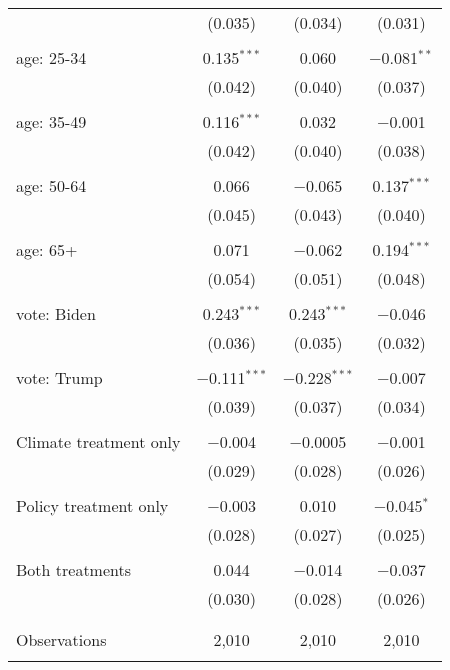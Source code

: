 \begin{tabular}{@{\extracolsep{5pt}}lccc}
  & (0.035) & (0.034) & (0.031) \\ 
  & & & \\ 
 age: 25-34 & 0.135$^{***}$ & 0.060 & $-$0.081$^{**}$ \\ 
  & (0.042) & (0.040) & (0.037) \\ 
  & & & \\ 
 age: 35-49 & 0.116$^{***}$ & 0.032 & $-$0.001 \\ 
  & (0.042) & (0.040) & (0.038) \\ 
  & & & \\ 
 age: 50-64 & 0.066 & $-$0.065 & 0.137$^{***}$ \\ 
  & (0.045) & (0.043) & (0.040) \\ 
  & & & \\ 
 age: 65+ & 0.071 & $-$0.062 & 0.194$^{***}$ \\ 
  & (0.054) & (0.051) & (0.048) \\ 
  & & & \\ 
 vote: Biden & 0.243$^{***}$ & 0.243$^{***}$ & $-$0.046 \\ 
  & (0.036) & (0.035) & (0.032) \\ 
  & & & \\ 
 vote: Trump & $-$0.111$^{***}$ & $-$0.228$^{***}$ & $-$0.007 \\ 
  & (0.039) & (0.037) & (0.034) \\ 
  & & & \\ 
 Climate treatment only & $-$0.004 & $-$0.0005 & $-$0.001 \\ 
  & (0.029) & (0.028) & (0.026) \\ 
  & & & \\ 
 Policy treatment only & $-$0.003 & 0.010 & $-$0.045$^{*}$ \\ 
  & (0.028) & (0.027) & (0.025) \\ 
  & & & \\ 
 Both treatments & 0.044 & $-$0.014 & $-$0.037 \\ 
  & (0.030) & (0.028) & (0.026) \\ 
  & & & \\ 
\hline \\[-1.8ex] 

Observations & 2,010 & 2,010 & 2,010 \\ 
\hline 
\hline \\[-1.8ex] 
\end{tabular} 